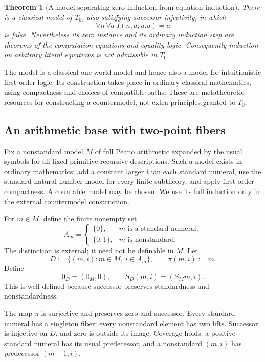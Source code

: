 \documentclass[11pt]{article}
\newtheorem{theorem}{Theorem}[section]
\theoremstyle{definition}
\begin{document}
\begin{theorem}[A model separating zero induction from equation induction]
\label{zi:main}
There is a classical model of \(T_0\), also satisfying successor injectivity, in which
\[
\forall n\,\forall a\; I(n,a;u.u)=a
\]
is false. Nevertheless its zero instance and its ordinary induction step are theorems of the computation equations and equality logic.
Consequently induction on arbitrary literal equations is not admissible in \(T_0\).
\end{theorem}

The model is a classical one-world model and hence also a model for intuitionistic first-order logic. Its construction takes place in ordinary classical mathematics, using compactness and choices of compatible paths. These are metatheoretic resources for constructing a countermodel, not extra principles granted to \(T_0\).

\subsection{An arithmetic base with two-point fibers}

Fix a nonstandard model \(M\) of full Peano arithmetic expanded by the usual symbols for all fixed primitive-recursive descriptions. Such a model exists in ordinary mathematics: add a constant larger than each standard numeral, use the standard natural-number model for every finite subtheory, and apply first-order compactness. A countable model may be chosen. We use its full induction only in the external countermodel construction.

For \(m\in M\), define the finite nonempty set
\[
A_m=
\begin{cases}
\{0\},&m\text{ is a standard numeral},\\
\{0,1\},&m\text{ is nonstandard}.
\end{cases}
\]
The distinction is external; it need not be definable in \(M\).
Let
\[
D:=\{(m,i):m\in M,\ i\in A_m\},\qquad
\pi(m,i):=m.
\]
Define
\[
0_D=(0_M,0),\qquad
S_D(m,i)=(S_Mm,i).
\]
This is well defined because successor preserves standardness and nonstandardness.

The map \(\pi\) is surjective and preserves zero and successor. Every standard numeral has a singleton fiber; every nonstandard element has two lifts. Successor is injective on \(D\), and zero is outside its image. Coverage holds: a positive standard numeral has its usual predecessor, and a nonstandard \((m,i)\) has predecessor \((m-1,i)\).
\end{document}
